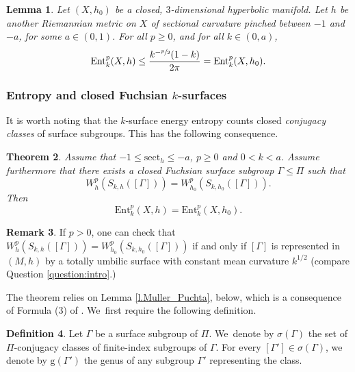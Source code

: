 \documentclass[10pt]{amsart}
\newcommand{\ksurface}{$k$\nobreakdash-surface\xspace}
\newcommand{\ksurfaces}{$k$\nobreakdash-surfaces\xspace}
\theoremstyle{plain}
\newtheorem{theorem}{Theorem}[section]
\newtheorem{lemma}[theorem]{Lemma}
\theoremstyle{definition}
\newtheorem{defi}[theorem]{Definition}
\newtheorem{remark}[theorem]{Remark}
\newcommand{\sect}{\mathrm{sect}}
\newcommand{\Ent}{\mathrm{Ent}}
\begin{document}
\begin{lemma}\label{l_inequality_entropy}
Let $(X,h_0)$ be a closed, $3$\nobreakdash-dimensional hyperbolic manifold. Let $h$ be another Riemannian metric on $X$ of sectional curvature pinched between $-1$ and $-a$, for some $a\in(0,1)$. For all $p\geq 0$, and for all $k\in(0,a)$,
\begin{equation*}
\Ent^{p}_{k}(X,h)\leq\frac{k^{-\sfrac{p}{2}}(1-k)}{2\pi}=\Ent^{p}_{k}(X,h_0).
\end{equation*}
\end{lemma}

\subsubsection{Entropy and closed Fuchsian \protect\ksurfaces} It is worth noting that the \ksurface energy entropy counts closed \emph{conjugacy classes} of surface subgroups. This has the following consequence.

\begin{theorem}\label{th.totally_umb_implies_big_entropy}
Assume that $-1\leq\sect_h\leq-a$, $p\geq 0$ and $0<k<a$. Assume furthermore that there exists a closed \emph{Fuchsian} surface subgroup $\Gamma\leq\Pi$ such that
\begin{equation*}
W^{p}_{h}(S_{k,h}([\Gamma]))=W^{p}_{h_0}(S_{k,h_0}([\Gamma])).
\end{equation*}
Then
\begin{equation*}
\Ent^{p}_{k}(X,h)=\Ent^{p}_{k}(X,h_0).
\end{equation*}
\end{theorem}

\begin{remark}
If $p>0$, one can check that $W^{p}_{h}(S_{k,h}([\Gamma]))=W^{p}_{h_0}(S_{k,h_0}([\Gamma]))$ if and only if $[\Gamma]$ is represented in $(M,h)$ by a totally umbilic surface with constant mean curvature $k^{1/2}$ (compare Question \ref{question:intro}.)
\end{remark}

The theorem relies on Lemma \ref{l.Muller_Puchta}, below, which is a consequence of Formula (3) of \cite{Muller_Puchta}. We~first require the following definition.

\begin{defi}\label{d.conj_classes}
Let $\Gamma$ be a surface subgroup of $\Pi$. We~denote by $\sigma(\Gamma)$ the set of $\Pi$-conjugacy classes of finite-index subgroups of $\Gamma$. For every $[\Gamma']\in\sigma(\Gamma)$, we denote by $\mathrm{g}(\Gamma')$ the genus of any subgroup $\Gamma'$ representing the class.
\end{defi}
\end{document}
